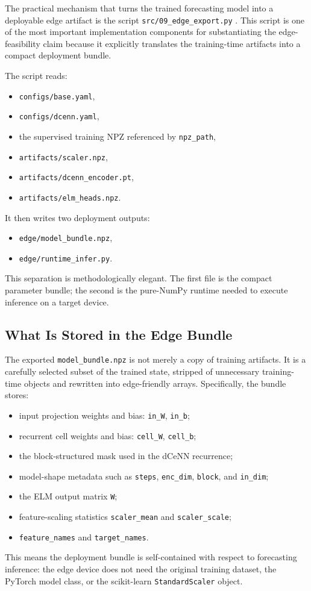 The practical mechanism that turns the trained forecasting model into a deployable edge artifact is the script \texttt{src/09\_edge\_export.py} \cite{repo_thesis_grid_anomaly}. This script is one of the most important implementation components for substantiating the edge-feasibility claim because it explicitly translates the training-time artifacts into a compact deployment bundle.

The script reads:
\begin{itemize}
	\item \texttt{configs/base.yaml},
	\item \texttt{configs/dcenn.yaml},
	\item the supervised training NPZ referenced by \texttt{npz\_path},
	\item \texttt{artifacts/scaler.npz},
	\item \texttt{artifacts/dcenn\_encoder.pt},
	\item \texttt{artifacts/elm\_heads.npz}.
\end{itemize}
It then writes two deployment outputs:
\begin{itemize}
	\item \texttt{edge/model\_bundle.npz},
	\item \texttt{edge/runtime\_infer.py}.
\end{itemize}
This separation is methodologically elegant. The first file is the compact parameter bundle; the second is the pure-NumPy runtime needed to execute inference on a target device.

\subsection{What Is Stored in the Edge Bundle}

The exported \texttt{model\_bundle.npz} is not merely a copy of training artifacts. It is a carefully selected subset of the trained state, stripped of unnecessary training-time objects and rewritten into edge-friendly arrays. Specifically, the bundle stores:
\begin{itemize}
	\item input projection weights and bias: \texttt{in\_W}, \texttt{in\_b};
	\item recurrent cell weights and bias: \texttt{cell\_W}, \texttt{cell\_b};
	\item the block-structured mask used in the dCeNN recurrence;
	\item model-shape metadata such as \texttt{steps}, \texttt{enc\_dim}, \texttt{block}, and \texttt{in\_dim};
	\item the ELM output matrix \texttt{W};
	\item feature-scaling statistics \texttt{scaler\_mean} and \texttt{scaler\_scale};
	\item \texttt{feature\_names} and \texttt{target\_names}.
\end{itemize}
This means the deployment bundle is self-contained with respect to forecasting inference: the edge device does not need the original training dataset, the PyTorch model class, or the scikit-learn \texttt{StandardScaler} object.

